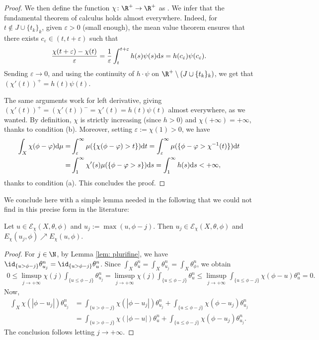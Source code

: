 \begin{proof}
We then define the function $\chi\colon \R^+\rightarrow \R^+$ as . We infer that the fundamental theorem of calculus holds almost everywhere. Indeed, for $t\notin J\cup \{t_k\}_k$, given $\varepsilon>0$ (small enough), the mean value theorem ensures that there exists $c_\varepsilon \in (t, t+\varepsilon)$ such that
\[\frac{\chi (t+\varepsilon)-\chi (t)}{\varepsilon} = \frac{1}{\varepsilon} \int_t^{t+\varepsilon} h(s) \psi(s) {\rm d}s = h(c_\varepsilon) \psi(c_\varepsilon).\]
Sending $\varepsilon\to 0$, and using the continuity of $h\cdot \psi$ on $\R^+\setminus (J\cup \{t_k\}_k)$, we get that $(\chi'(t))^+=h(t)\psi(t)$.

The same arguments work for left derivative, giving $(\chi'(t))^+=(\chi'(t))^-=\chi'(t)=h(t)\psi(t)$ almost everywhere, as we wanted.
By definition, $\chi$ is strictly increasing (since $h> 0$) and $\chi(+\infty)=+\infty$, thanks to condition (b). Moreover, setting $\varepsilon:=\chi (1)>0$, we have
\begin{align*}
\int_X \chi (\phi-\varphi) {\rm d}\mu = & \int_{\varepsilon}^\infty \mu(\{ \chi (\phi-\varphi) >t\}) {\rm d}t=\int_{\varepsilon}^\infty \mu(\{ \phi-\varphi >\chi^{-1}(t)\}) {\rm d}t\\
=& \int_{1}^\infty \chi'(s) \mu(\{ \phi-\varphi >s\}) {\rm d}s= \int_{1}^\infty h(s) {\rm d}s <+\infty,
\end{align*}
thanks to condition (a). This concludes the proof.
\end{proof}

We conclude here with a simple lemma needed in the following that we could not find in this precise form in the literature:

\begin{Lemma}\label{energy increases}
 Let $u\in \mathcal{E}_{\chi}(X,\theta,\phi)$ and $u_j:=\max (u,\phi -j)$. Then $u_j \in \mathcal{E}_{\chi}(X,\theta,\phi)$ and $E_{\chi}(u_j,\phi) \nearrow E_{\chi}(u,\phi)$.
\end{Lemma}
\begin{proof}
 For $j\in \N$, by Lemma \ref{lem: plurifine}, we have $\id_{\{u>\phi -j\}} \theta_{u_j}^n= \id_{\{u>\phi-j\}} \theta_{u}^n$. Since $\int_X \theta_{u}^n=\int_X \theta_{u_j}^n=\int_X \theta_\phi^n$, we obtain
\begin{align*}
0\leq \limsup_{j\to +\infty} \chi(j)\int_{\{u\leq \phi-j\}}\!\theta_{u_j}^n = \limsup_{j\to +\infty} \chi(j)\int_{\{u\leq \phi-j\}}\!\theta_{u}^n
\leq \limsup_{j\to +\infty} \int_{\{u\leq\phi-j\}}\! \chi (\phi-u)\theta_{u}^n =0.
\end{align*}
Now,
\begin{align*}
\int_X \chi (|\phi-u_j|) \theta_{u_j}^n &= \int_{\{ u > \phi-j\}} \chi (|\phi-u_j|) \theta_{u_j}^n+ \int_{\{ u \leq \phi-j\}} \chi (\phi-u_j) \theta_{u_j}^n \\
 &= \int_{\{ u > \phi-j\}} \chi (|\phi-u|) \theta_{u}^n+ \int_{\{ u \leq \phi-j\}} \chi (\phi-u_j) \theta_{u_j}^n.
\end{align*}
The conclusion follows letting $j\rightarrow +\infty$.
\end{proof}


